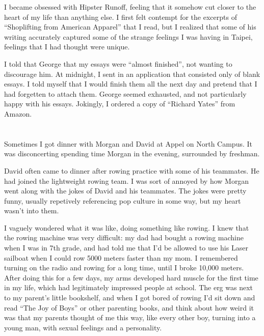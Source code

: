 I became obsessed with Hipster Runoff, feeling that it somehow cut closer to the
heart of my life than anything else.  I first felt contempt for the excerpts of
``Shoplifting from American Apparel'' that I read, but I realized that some of his
writing accurately captured some of the strange feelings I was having in Taipei,
feelings that I had thought were unique.

I told that George that my essays were ``almost finished'', not wanting to
discourage him.  At midnight, I sent in an application that consisted only of
blank essays.  I told myself that I would finish them all the next day and
pretend that I had forgetten to attach them.  George seemed exhausted, and not
particularly happy with his essays.  Jokingly, I ordered a copy of ``Richard
Yates'' from Amazon.

\section{}

Sometimes I got dinner with Morgan and David at Appel on North Campus.  It was
disconcerting spending time Morgan in the evening, surrounded by freshman.

David often came to dinner after rowing practice with some of his teammates.  He
had joined the lightweight rowing team.  I was sort of annoyed by how Morgan
went along with the jokes of David and his teammates.  The jokes were pretty
funny, usually repetively referencing pop culture in some way, but my heart
wasn't into them.  

I vaguely wondered what it was like, doing something like rowing.   I knew that
the rowing machine was very difficult: my dad had bought a rowing machine when I
was in 7th grade, and had told me that I'd be allowed to use his Laser sailboat
when I could row 5000 meters faster than my mom.  I remembered turning on the
radio and rowing for a long time, until I broke 10,000 meters.  After doing this
for a few days, my arms developed hard muscle for the first time in my life,
which had legitimately impressed people at school.  The erg was next to my
parent's little bookshelf, and when I got bored of rowing I'd sit down and read
``The Joy of Boys'' or other parenting books, and think about how weird it was
that my parents thought of me this way, like every other boy, turning into a
young man, with sexual feelings and a personality.  

\section{}

